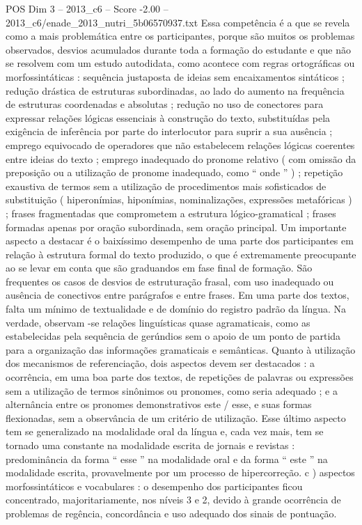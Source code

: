 \begin{textsample}{POS Dim 3 – 2013\_c6 – Score -2.00 – 2013\_c6/enade\_2013\_nutri\_5b06570937.txt}
Essa competência é a que se revela como a mais problemática entre os participantes, porque são muitos os problemas observados, desvios acumulados durante toda a formação do estudante e que não se resolvem com um estudo autodidata, como acontece com regras ortográficas ou morfossintáticas : sequência justaposta de ideias sem encaixamentos sintáticos ; redução drástica de estruturas subordinadas, ao lado do aumento na frequência de estruturas coordenadas e absolutas ; redução no uso de conectores para expressar relações lógicas essenciais à construção do texto, substituídas pela exigência de inferência por parte do interlocutor para suprir a sua ausência ; emprego equivocado de operadores que não estabelecem relações lógicas coerentes entre ideias do texto ; emprego inadequado do pronome relativo ( com omissão da preposição ou a utilização de pronome inadequado, como “ onde ” ) ; repetição exaustiva de termos sem a utilização de procedimentos mais sofisticados de substituição ( hiperonímias, hiponímias, nominalizações, expressões metafóricas ) ; frases fragmentadas que comprometem a estrutura lógico-gramatical ; frases formadas apenas por oração subordinada, sem oração principal.
Um importante aspecto a destacar é o baixíssimo desempenho de uma parte dos participantes em relação à estrutura formal do texto produzido, o que é extremamente preocupante ao se levar em conta que são graduandos em fase final de formação.
São frequentes os casos de desvios de estruturação frasal, com uso inadequado ou ausência de conectivos entre parágrafos e entre frases.
Em uma parte dos textos, falta um mínimo de textualidade e de domínio do registro padrão da língua.
Na verdade, observam -se relações linguísticas quase agramaticais, como as estabelecidas pela sequência de gerúndios sem o apoio de um ponto de partida para a organização das informações gramaticais e semânticas.
Quanto à utilização dos mecanismos de referenciação, dois aspectos devem ser destacados : a ocorrência, em uma boa parte dos textos, de repetições de palavras ou expressões sem a utilização de termos sinônimos ou pronomes, como seria adequado ; e a alternância entre os pronomes demonstrativos este / esse, e suas formas flexionadas, sem a observância de um critério de utilização.
Esse último aspecto tem se generalizado na modalidade oral da língua e, cada vez mais, tem se tornado uma constante na modalidade escrita de jornais e revistas : predominância da forma “ esse ” na modalidade oral e da forma “ este ” na modalidade escrita, provavelmente por um processo de hipercorreção. c ) aspectos morfossintáticos e vocabulares : o desempenho dos participantes ficou concentrado, majoritariamente, nos níveis 3 e 2, devido à grande ocorrência de problemas de regência, concordância e uso adequado dos sinais de pontuação.

\end{textsample}
